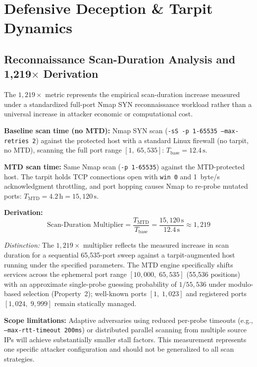 \documentclass[journal]{IEEEtran}
\renewcommand{\_}{\textunderscore\allowbreak}
\begin{document}
\section{Defensive Deception \& Tarpit Dynamics}
\subsection{Reconnaissance Scan-Duration Analysis and 1,219$\times$ Derivation}
The $1{,}219\times$ metric represents the empirical scan-duration increase measured
under a standardized full-port Nmap SYN reconnaissance workload rather than a universal
increase in attacker economic or computational cost.

\textbf{Baseline scan time (no MTD):} Nmap SYN scan
(\texttt{-sS -p 1-65535 --max-retries 2}) against the protected host with a
standard Linux firewall (no tarpit, no MTD), scanning the full port range
$[1,\; 65{,}535]$: $T_{\text{base}} = 12.4\,\text{s}$.

\textbf{MTD scan time:} Same Nmap scan (\texttt{-p 1-65535}) against the
MTD-protected host. The tarpit holds TCP connections open with \texttt{win~0}
and 1~byte/s acknowledgment throttling, and port hopping causes Nmap to
re-probe mutated ports: $T_{\text{MTD}} = 4.2\,\text{h} = 15{,}120\,\text{s}$.

\textbf{Derivation:}
\begin{equation}
  \text{Scan-Duration Multiplier} = \frac{T_{\text{MTD}}}{T_{\text{base}}}
    = \frac{15{,}120\,\text{s}}{12.4\,\text{s}} \approx 1{,}219
  \label{eq:mtd_cost}
\end{equation}

\textit{Distinction:} The $1{,}219\times$ multiplier reflects the measured increase in
scan duration for a sequential 65,535-port sweep against a tarpit-augmented host running
under the specified parameters. The MTD engine specifically shifts services across the
ephemeral port range $[10{,}000,\; 65{,}535]$ (55{,}536 positions) with an approximate
single-probe guessing probability of $1/55{,}536$ under modulo-based selection (Property~2);
well-known ports $[1,\; 1{,}023]$ and registered ports $[1{,}024,\; 9{,}999]$ remain statically managed.

\textbf{Scope limitations:} Adaptive adversaries using reduced per-probe timeouts
(e.g., \texttt{--max-rtt-timeout 200ms}) or distributed parallel scanning from multiple
source IPs will achieve substantially smaller stall factors. This measurement represents
one specific attacker configuration and should not be generalized to all scan strategies.
\end{document}
